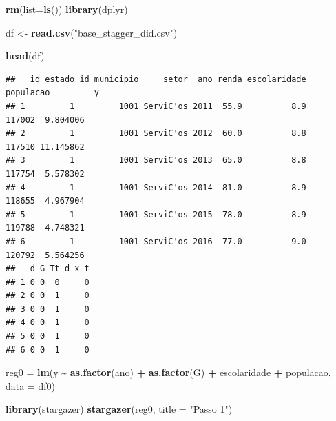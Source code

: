 \documentclass[
]{article}
\author{}
\date{\vspace{-2.5em}}
\newenvironment{Shaded}{\begin{snugshade}}{\end{snugshade}}
\newcommand{\AttributeTok}[1]{\textcolor[rgb]{0.13,0.29,0.53}{#1}}
\newcommand{\DecValTok}[1]{\textcolor[rgb]{0.00,0.00,0.81}{#1}}
\newcommand{\FunctionTok}[1]{\textcolor[rgb]{0.13,0.29,0.53}{\textbf{#1}}}
\newcommand{\NormalTok}[1]{#1}
\newcommand{\OtherTok}[1]{\textcolor[rgb]{0.56,0.35,0.01}{#1}}
\newcommand{\SpecialCharTok}[1]{\textcolor[rgb]{0.81,0.36,0.00}{\textbf{#1}}}
\newcommand{\StringTok}[1]{\textcolor[rgb]{0.31,0.60,0.02}{#1}}
\begin{document}
\begin{Shaded}
\begin{Highlighting}[]
\FunctionTok{rm}\NormalTok{(}\AttributeTok{list=}\FunctionTok{ls}\NormalTok{())}
\FunctionTok{library}\NormalTok{(dplyr)}

\NormalTok{df }\OtherTok{\textless{}{-}} \FunctionTok{read.csv}\NormalTok{(}\StringTok{"base\_stagger\_did.csv"}\NormalTok{)}

\FunctionTok{head}\NormalTok{(df)}
\end{Highlighting}
\end{Shaded}

\begin{verbatim}
##   id_estado id_municipio     setor  ano renda escolaridade populacao         y
## 1         1         1001 ServiC'os 2011  55.9          8.9    117002  9.804006
## 2         1         1001 ServiC'os 2012  60.0          8.8    117510 11.145862
## 3         1         1001 ServiC'os 2013  65.0          8.8    117754  5.578302
## 4         1         1001 ServiC'os 2014  81.0          8.9    118655  4.967904
## 5         1         1001 ServiC'os 2015  78.0          8.9    119788  4.748321
## 6         1         1001 ServiC'os 2016  77.0          9.0    120792  5.564256
##   d G Tt d_x_t
## 1 0 0  0     0
## 2 0 0  1     0
## 3 0 0  1     0
## 4 0 0  1     0
## 5 0 0  1     0
## 6 0 0  1     0
\end{verbatim}

\begin{Shaded}
\end{Shaded}

\begin{Shaded}
\begin{Highlighting}[]
\NormalTok{reg0 }\OtherTok{=} \FunctionTok{lm}\NormalTok{(y }\SpecialCharTok{\textasciitilde{}} \FunctionTok{as.factor}\NormalTok{(ano) }\SpecialCharTok{+} \FunctionTok{as.factor}\NormalTok{(G) }\SpecialCharTok{+}\NormalTok{ escolaridade }\SpecialCharTok{+}\NormalTok{ populacao, }
          \AttributeTok{data =}\NormalTok{ df0)}

\FunctionTok{library}\NormalTok{(stargazer)}
\FunctionTok{stargazer}\NormalTok{(reg0, }\AttributeTok{title =} \StringTok{"Passo 1"}\NormalTok{)}
\end{Highlighting}
\end{Shaded}
\end{document}
